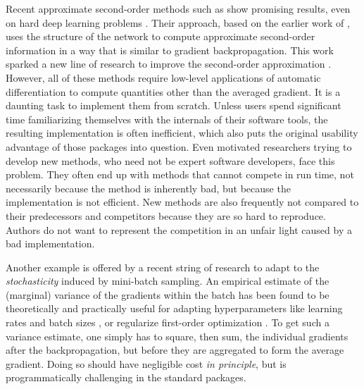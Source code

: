 Recent approximate second-order methods such as \KFAC
\citep{martens2015optimizing} show promising results, even on hard deep learning
problems \citep{tsuji2019performance}. Their approach, based on the earlier work
of \citet{schraudolph2002fast}, uses the structure of the network to compute
approximate second-order information in a way that is similar to gradient
backpropagation. This work sparked a new line of research to improve the
second-order approximation \citep{grosse2016kronecker, botev2017practical,
  martens2018kronecker, george2018fast}. However, all of these methods require
low-level applications of automatic differentiation to compute quantities other
than the averaged gradient. It is a daunting task to implement them from
scratch. Unless users spend significant time familiarizing themselves with the
internals of their software tools, the resulting implementation is often
inefficient, which also puts the original usability advantage of those packages
into question. Even motivated researchers trying to develop new methods, who
need not be expert software developers, face this problem. They often end up
with methods that cannot compete in run time, not necessarily because the method
is inherently bad, but because the implementation is not efficient. New methods
are also frequently not compared to their predecessors and competitors because
they are so hard to reproduce. Authors do not want to represent the competition
in an unfair light caused by a bad implementation.

Another example is offered by a recent string of research to adapt to the
\emph{stochasticity} induced by mini-batch sampling. An empirical estimate of
the (marginal) variance of the gradients within the batch has been found to be
theoretically and practically useful for adapting hyperparameters like learning
rates \citep{mahsereci2017probabilistic} and batch sizes
\citep{balles2017coupling}, or regularize first-order optimization
\citep{leroux2007topmoumoute, balles2018dissecting, katharopoulos2018samples}.
To get such a variance estimate, one simply has to square, then sum, the
individual gradients after the backpropagation, but before they are aggregated
to form the average gradient. Doing so should have negligible cost \emph{in
  principle}, but is programmatically challenging in the standard packages.

